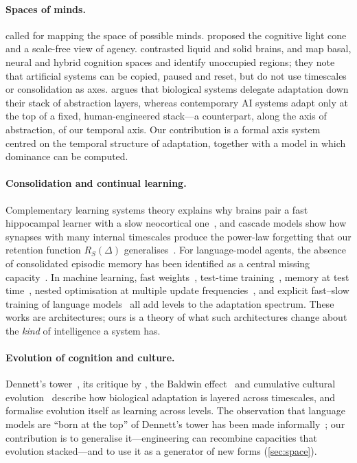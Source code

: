 \documentclass[11pt]{article}
\theoremstyle{plain}
\theoremstyle{definition}
\theoremstyle{remark}
\begin{document}
\paragraph{Spaces of minds.}
\citet{sloman1984space} called for mapping the space of possible minds. \citet{levin2019computational,levin2022tame} proposed the cognitive light cone and a scale-free view of agency. \citet{sole2019liquid} contrasted liquid and solid brains, and \citet{sole2026cognition} map basal, neural and hybrid cognition spaces and identify unoccupied regions; they note that artificial systems can be copied, paused and reset, but do not use timescales or consolidation as axes. \citet{bennett2024biological} argues that biological systems delegate adaptation down their stack of abstraction layers, whereas contemporary AI systems adapt only at the top of a fixed, human-engineered stack---a counterpart, along the axis of abstraction, of our temporal axis. Our contribution is a formal axis system centred on the temporal structure of adaptation, together with a model in which dominance can be computed.

\paragraph{Consolidation and continual learning.}
Complementary learning systems theory explains why brains pair a fast hippocampal learner with a slow neocortical one~\citep{mcclelland1995why,kumaran2016what}, and cascade models show how synapses with many internal timescales produce the power-law forgetting that our retention function $R_S(\Delta)$ generalises~\citep{fusi2005cascade,benna2016computational}. For language-model agents, the absence of consolidated episodic memory has been identified as a central missing capacity~\citep{pink2025episodic}. In machine learning, fast weights~\citep{hinton1987fast,schmidhuber1992learning,ba2016using}, test-time training~\citep{sun2020test}, memory at test time~\citep{behrouz2025titans}, nested optimisation at multiple update frequencies~\citep{behrouz2025nested}, and explicit fast--slow training of language models~\citep{tiwari2026fast} all add levels to the adaptation spectrum. These works are architectures; ours is a theory of what such architectures change about the \emph{kind} of intelligence a system has.

\paragraph{Evolution of cognition and culture.}
Dennett's tower~\citep{dennett1995darwin,dennett1996kinds}, its critique by \citet{godfreysmith2018towers}, the Baldwin effect~\citep{hinton1987learning} and cumulative cultural evolution~\citep{boyd1985culture,tomasello1999cultural,henrich2016secret} describe how biological adaptation is layered across timescales, and \citet{vanchurin2022toward} formalise evolution itself as learning across levels. The observation that language models are ``born at the top'' of Dennett's tower has been made informally~\citep{damon_born}; our contribution is to generalise it---engineering can recombine capacities that evolution stacked---and to use it as a generator of new forms (\cref{sec:space}).
\end{document}
